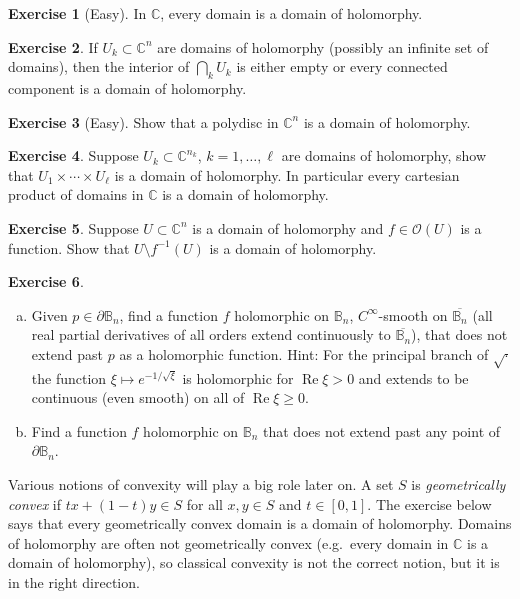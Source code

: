 \documentclass[12pt,openany]{book}
\renewcommand{\Re}{\operatorname{Re}}
\newcommand{\C}{{\mathbb{C}}}
\newcommand{\bB}{{\mathbb{B}}}
\newcommand{\sO}{{\mathscr{O}}}
\newcommand{\myindex}[1]{#1\index{#1}}
\theoremstyle{plain}
\theoremstyle{remark}
\theoremstyle{definition}
\newenvironment{exbox}{%
    \def\FrameCommand{\vrule width 1pt \relax\hspace{10pt}}%
    \MakeFramed{\advance\hsize-\width\FrameRestore}%
}{%
    \endMakeFramed
}
\newenvironment{exparts}{%
    \leavevmode\begin{enumerate}[a),noitemsep,topsep=0pt,parsep=0pt,partopsep=0pt]
}{%
    \end{enumerate}
}
\theoremstyle{exercise}
\newtheorem{exercise}{Exercise}[section]
\theoremstyle{example}
\begin{document}
\begin{exbox}
\begin{exercise}[Easy]
In $\C$, every domain is a domain of holomorphy.
\end{exercise}

\begin{exercise}
If $U_k \subset \C^n$ are domains of holomorphy (possibly an infinite set of
domains), then the interior of
$\bigcap_{k} U_k$
is either empty or every connected component is a domain of holomorphy.
\end{exercise}

\begin{exercise}[Easy]
Show that a polydisc in $\C^n$ is a domain of holomorphy.
\end{exercise}

\begin{exercise} \label{exercise:cartesianproddomofhol}
Suppose $U_k \subset \C^{n_k}$, $k=1,\ldots,\ell$ are domains of holomorphy,
show that
$U_1 \times \cdots \times U_\ell$ is a domain of holomorphy.
In particular every cartesian product of domains in $\C$ is a domain of
holomorphy.
\end{exercise}

\begin{exercise}
Suppose $U \subset \C^n$ is a domain of holomorphy and $f \in \sO(U)$
is a function.  Show that $U \setminus f^{-1}(U)$ is a domain of holomorphy.
\end{exercise}

\begin{exercise}
\begin{exparts}
\item
Given $p \in \partial \bB_n$, find a function $f$ holomorphic on
$\bB_n$,
$C^\infty$-smooth on $\overline{\bB_n}$ (all real partial derivatives of
all orders extend
continuously to $\overline{\bB_n}$), that does not extend past $p$
as a holomorphic function.
Hint: For the principal branch of $\sqrt{\cdot}$ the function $\xi \mapsto
e^{-1/\sqrt{\xi}}$ is holomorphic for $\Re \xi > 0$ and extends to
be continuous (even smooth) on all of $\Re \xi \geq 0$.
\item
Find a function $f$ holomorphic on $\bB_n$
that does not extend past any point of
$\partial \bB_n$.
\end{exparts}
\end{exercise}
\end{exbox}

Various notions of convexity will play a big role later on.
A set $S$ is \emph{\myindex{geometrically convex}}
if $t x + (1-t)y \in S$
for all $x,y \in S$ and $t \in [0,1]$.
The exercise below
says that every geometrically convex domain is a domain of holomorphy.
Domains of holomorphy are often not geometrically convex
(e.g.\ every domain in $\C$ is a domain of holomorphy),
so classical convexity is not the correct notion, but it is
in the right direction.
\end{document}
